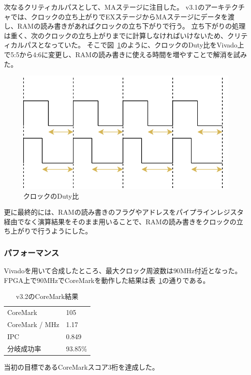 \documentclass[dvipdfmx,10pt,a4paper,titlepage]{jsarticle}
\begin{document}
    次なるクリティカルパスとして、MAステージに注目した。
    v3.1のアーキテクチャでは、クロックの立ち上がりでEXステージからMAステージにデータを渡し、RAMの読み書きがあればクロックの立ち下がりで行う。
    立ち下がりの処理は重く、次のクロックの立ち上がりまでに計算しなければいけないため、クリティカルパスとなっていた。
    そこで図~\ref{fig:clkduty}のように、クロックのDuty比をVivado上で5:5から4:6に変更し、RAMの読み書きに使える時間を増やすことで解消を試みた。
    \begin{figure}
        \centering
        \includegraphics[width=12cm]{figure/clock_duty.png}
        \caption{クロックのDuty比}\label{fig:clkduty}
    \end{figure}
    更に最終的には、RAMの読み書きのフラグやアドレスをパイプラインレジスタ経由でなく演算結果をそのまま用いることで、RAMの読み書きをクロックの立ち上がりで行うようにした。
    \subsubsection{パフォーマンス}
    Vivadoを用いて合成したところ、最大クロック周波数は$90\mathrm{MHz}$付近となった。
    FPGA上で$90\mathrm{MHz}$でCoreMarkを動作した結果は表~\ref{tab:v3.2}の通りである。
    \begin{table}[h]
        \begin{center}
            \caption{v3.2のCoreMark結果}\label{tab:v3.2}
            \begin{tabular}{ll}
                CoreMark & 105\\
                CoreMark / MHz & 1.17 \\
                IPC & 0.849 \\
                分岐成功率 & 93.85\% \\
            \end{tabular}
        \end{center}
    \end{table}
    当初の目標であるCoreMarkスコア3桁を達成した。
\end{document}
